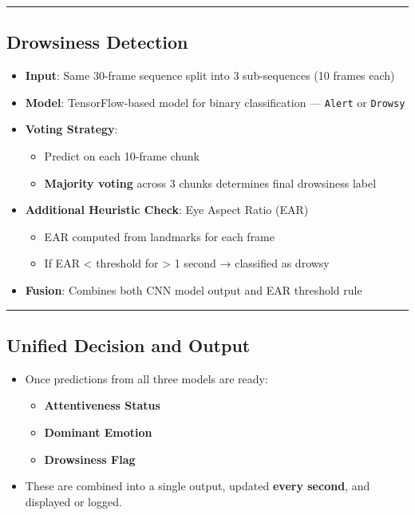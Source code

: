 \documentclass[
  letterpaper,
  DIV=11,
  numbers=noendperiod]{scrreport}
\providecommand{\tightlist}{%
  \setlength{\itemsep}{0pt}\setlength{\parskip}{0pt}}
\begin{document}
\begin{center}\rule{0.5\linewidth}{0.5pt}\end{center}

\subsection{Drowsiness Detection}\label{drowsiness-detection}

\begin{itemize}
\tightlist
\item
  \textbf{Input}: Same 30-frame sequence split into 3 sub-sequences (10
  frames each)
\item
  \textbf{Model}: TensorFlow-based model for binary classification ---
  \texttt{Alert} or \texttt{Drowsy}
\item
  \textbf{Voting Strategy}:

  \begin{itemize}
  \tightlist
  \item
    Predict on each 10-frame chunk
  \item
    \textbf{Majority voting} across 3 chunks determines final drowsiness
    label
  \end{itemize}
\item
  \textbf{Additional Heuristic Check}: Eye Aspect Ratio (EAR)

  \begin{itemize}
  \tightlist
  \item
    EAR computed from landmarks for each frame
  \item
    If EAR \textless{} threshold for \textgreater{} 1 second →
    classified as drowsy
  \end{itemize}
\item
  \textbf{Fusion}: Combines both CNN model output and EAR threshold rule
\end{itemize}

\begin{center}\rule{0.5\linewidth}{0.5pt}\end{center}

\subsection{Unified Decision and
Output}\label{unified-decision-and-output}

\begin{itemize}
\tightlist
\item
  Once predictions from all three models are ready:

  \begin{itemize}
  \tightlist
  \item
    \textbf{Attentiveness Status}
  \item
    \textbf{Dominant Emotion}
  \item
    \textbf{Drowsiness Flag}
  \end{itemize}
\item
  These are combined into a single output, updated \textbf{every
  second}, and displayed or logged.
\end{itemize}
\end{document}
